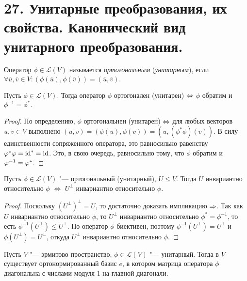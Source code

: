 \section{27. Унитарные преобразования, их свойства. Канонический вид унитарного преобразования.}

\begin{definition}
	Оператор $\phi \in \mathcal{L}(V)$ называется \textit{ортогональным} (\textit{унитарным}), если $\forall \overline{u}, \overline{v} \in V: (\phi(\overline{u}), \phi(\overline{v})) = (\overline{u}, \overline{v})$.
\end{definition}

\begin{theorem}
	Пусть $\phi \in \mathcal{L}(V)$. Тогда оператор $\phi$ ортогонален (унитарен) $\hm\Leftrightarrow$ $\phi$ обратим и $\phi^{-1} = \phi^{*}$.
\end{theorem}

\begin{proof}
	По определению, $\phi$ ортогональнен (унитарен) $\hm{\Leftrightarrow}$ для любых векторов $\overline{u}, \overline{v} \in V$ выполнено $(\overline{u}, \overline{v}) = (\phi(\overline{u}), \phi(\overline{v})) = (\overline{u}, (\phi^*\phi)(\overline{v}))$. В силу единственности сопряженного оператора, это равносильно равенству $\varphi^*\varphi = \mathrm{id}^* = \mathrm{id}$. Это, в свою очередь, равносильно тому, что $\phi$ обратим и $\phi^{-1} \hm{=} \phi^{*}$.
\end{proof}

\begin{proposition}
	Пусть $\phi\in \mathcal{L}(V)$ "--- ортогональный (унитарный), $U \le V$. Тогда $U$ инвариантно относительно $\phi$ $\Leftrightarrow$ $U^\perp$ инвариантно относительно $\phi$.
\end{proposition}

\begin{proof}
	Поскольку $(U^\perp)^\perp = U$, то достаточно доказать импликацию $\Rightarrow$. Так как $U$ инвариантно относительно $\phi$, то $U^\perp$ инвариантно относительно $\phi^* = \phi^{-1}$, то есть $\phi^{-1}(U^\perp) \le U^\perp$. Но оператор $\phi$ биективен, поэтому $\phi^{-1}(U^\perp) = U^\perp$ и $\phi(U^\perp) = U^\perp$, откуда $U^\perp$ инвариантно относительно $\phi$.
\end{proof}

\begin{theorem}
	Пусть $V$ "--- эрмитово пространство, $\phi \in \mathcal{L}(V)$ "--- унитарный. Тогда в $V$ существует ортонормированный базис $e$, в котором матрица оператора $\phi$ диагональна с числами модуля $1$ на главной диагонали.
\end{theorem}

